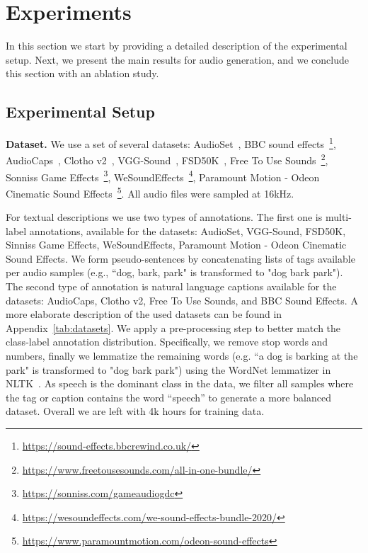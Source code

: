\section{Experiments}
\label{sec:exp}
In this section we start by providing a detailed description of the experimental setup. Next, we present the main results for audio generation, and we conclude this section with an ablation study.

\subsection{Experimental Setup}
\label{sec:setup}
{\noindent \bf{Dataset.}} We use a set of several datasets: AudioSet~\citep{gemmeke2017audio}, BBC sound effects~\footnote{\url{https://sound-effects.bbcrewind.co.uk/}}, AudioCaps~\citep{kim2019audiocaps}, Clotho v2~\citep{drossos2020clotho}, VGG-Sound~\citep{chen2020vggsound}, FSD50K~\citep{fonseca2021fsd50k}, Free To Use Sounds~\footnote{\url{https://www.freetousesounds.com/all-in-one-bundle/}}, Sonniss Game Effects~\footnote{\url{https://sonniss.com/gameaudiogdc}}, WeSoundEffects~\footnote{\url{https://wesoundeffects.com/we-sound-effects-bundle-2020/}}, Paramount Motion - Odeon Cinematic Sound Effects~\footnote{\url{https://www.paramountmotion.com/odeon-sound-effects}}. All audio files were sampled at 16kHz.

For textual descriptions we use two types of annotations. The first one is multi-label annotations, available for the datasets: AudioSet, VGG-Sound, FSD50K, Sinniss Game Effects, WeSoundEffects, Paramount Motion - Odeon Cinematic Sound Effects. We form pseudo-sentences by concatenating lists of tags available per audio samples (e.g., ``dog, bark, park" is transformed to "dog bark park"). The second type of annotation is natural language captions available for the datasets: AudioCaps, Clotho v2, Free To Use Sounds, and BBC Sound Effects. A more elaborate description of the used datasets can be found in Appendix~\ref{tab:datasets}.
We apply a pre-processing step to better match the class-label annotation distribution. Specifically, we remove stop words and numbers, finally we lemmatize the remaining words (e.g. ``a dog is barking at the park" is transformed to "dog bark park") using the WordNet lemmatizer in NLTK~\citep{bird2009natural}. As speech is the dominant class in the data, we filter all samples where the tag or caption contains the word ``speech'' to generate a more balanced dataset. Overall we are left with 4k hours for training data.

